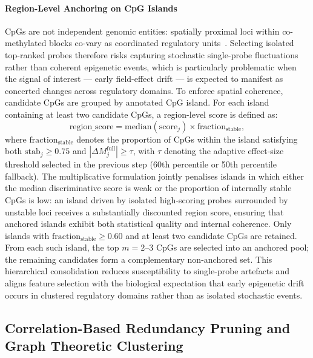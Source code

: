 \paragraph{Region-Level Anchoring on CpG Islands}

CpGs are not independent genomic entities: spatially 
proximal loci within co-methylated blocks co-vary as 
coordinated regulatory 
units~\cite{Hansen2011}. Selecting isolated top-ranked 
probes therefore risks capturing stochastic single-probe 
fluctuations rather than coherent epigenetic events, 
which is particularly problematic when the signal of 
interest — early field-effect drift — is expected to 
manifest as concerted changes across regulatory domains.
To enforce spatial coherence, candidate CpGs are grouped 
by annotated CpG island. For each island containing at 
least two candidate CpGs, a region-level score is defined 
as:
\begin{equation}
\mathrm{region\_score}
=
\mathrm{median}(\mathrm{score}_j)
\times
\mathrm{fraction}_{\mathrm{stable}},
\end{equation}
where $\mathrm{fraction}_{\mathrm{stable}}$ denotes the proportion 
of CpGs within the island satisfying both 
$\mathrm{stab}_j \geq 0.75$ and 
$|\Delta M_{j}^{\mathrm{full}}| \geq \tau$, 
with $\tau$ denoting the adaptive effect-size threshold 
selected in the previous step (60th percentile or 50th percentile fallback). 
The multiplicative formulation jointly penalises islands in which 
either the median discriminative score is weak or the proportion of 
internally stable CpGs is low: an island driven by isolated 
high-scoring probes surrounded by unstable loci receives a 
substantially discounted region score, ensuring that anchored 
islands exhibit both statistical quality and internal coherence. 
Only islands with $\mathrm{fraction}_{\mathrm{stable}} \geq 0.60$ and at 
least two candidate CpGs are retained. From each such 
island, the top $m = 2$--$3$ CpGs are selected into an 
anchored pool; the remaining candidates form a 
complementary non-anchored set. This hierarchical 
consolidation reduces susceptibility to single-probe 
artefacts and aligns feature selection with the biological 
expectation that early epigenetic drift occurs in clustered 
regulatory domains rather than as isolated stochastic 
events.

\subsection{Correlation-Based Redundancy Pruning and Graph Theoretic Clustering}
\label{subsec:fs_corr_pruning}

